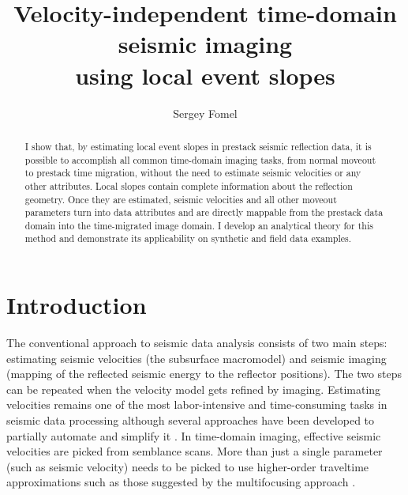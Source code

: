 \title{Velocity-independent time-domain seismic imaging \\ using
local event slopes}



\author{Sergey Fomel}
\address{Bureau of Economic Geology, \\
John A. and Katherine G. Jackson School of Geosciences \\
The University of Texas at Austin \\
University Station, Box X \\
Austin, TX 78713-8972}

\maketitle

\begin{abstract}
  I show that, by estimating local event slopes in prestack seismic
  reflection data, it is possible to accomplish all common time-domain
  imaging tasks, from normal moveout to prestack time migration,
  without the need to estimate seismic velocities or any other
  attributes. Local slopes contain complete information about the
  reflection geometry. Once they are estimated, seismic velocities and
  all other moveout parameters turn into data attributes and are
  directly mappable from the prestack data domain into the
  time-migrated image domain. I develop an analytical theory for this
  method and demonstrate its applicability on synthetic and field data
  examples.
\end{abstract}

\section{Introduction}

The conventional approach to seismic data analysis \cite[]{yilmaz}
consists of two main steps: estimating seismic velocities (the
subsurface macromodel) and seismic imaging (mapping of the reflected
seismic energy to the reflector positions). The two steps can be
repeated when the velocity model gets refined by imaging. 
Estimating velocities remains one of the most
labor-intensive and time-consuming tasks in seismic data processing
although several approaches have been developed to partially automate
and simplify it \cite[]{SEG-1999-11621165,SEG-2003-20882091,lambare2}.
In time-domain imaging, effective seismic velocities are picked from
semblance scans. More than just a single parameter (such as seismic
velocity) needs to be picked to use higher-order traveltime
approximations such as those suggested by the multifocusing approach
\cite[]{gelchinsky,crs}.

